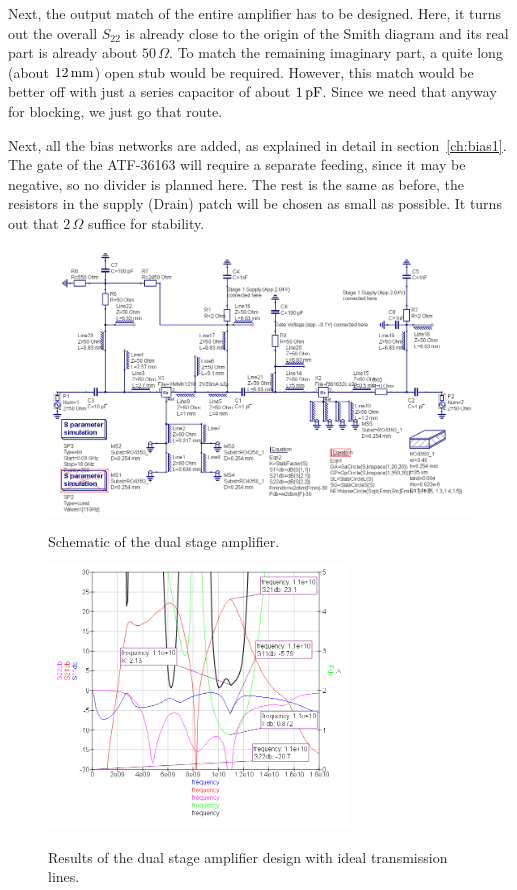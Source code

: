 Next, the output match of the entire amplifier has to be
designed. Here, it turns out the overall $S_{22}$ is already close to
the origin of the Smith diagram and its real part is already about
$50\,\Omega$. To match the remaining imaginary part, a quite long
(about $12\,\mathrm{mm}$) open stub would be required. However, this
match would be better off with just a series capacitor of about
$1\,\mathrm{pF}$. Since we need that anyway for blocking, we just go that
route. 


Next, all the bias networks are added, as explained in detail in
section~\ref{ch:bias1}. The gate of the ATF-36163 will require a
separate feeding, since it may be negative, so no divider is planned
here. The rest is the same as before, the resistors in the supply
(Drain) patch will be chosen as small as possible. It turns out that
$2\,\Omega$ suffice for stability.

\begin{figure}
  \centering
  {\includegraphics[width=12cm]{dual1_sch.png}}
  \caption{Schematic of the dual stage amplifier.}
  \label{fig:dual1_sch}
\end{figure}

\begin{figure}
  \centering
  {\includegraphics[width=8cm]{dual1_result.png}}
  \caption{Results of the dual stage amplifier design with ideal
    transmission lines.}
  \label{fig:dual1_result}
\end{figure}

